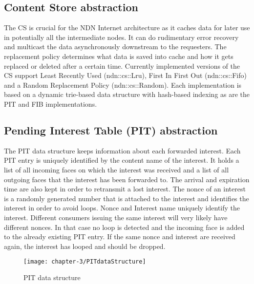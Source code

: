 \subsection{Content Store abstraction}

The CS is crucial for the NDN Internet architecture as it caches data for later use in potentially all the intermediate nodes. It can do rudimentary error recovery and multicast the data asynchronously downstream to the requesters. The replacement policy determines what data is saved into cache and how it gets replaced or deleted after a certain time. Currently implemented versions of the CS support Least Recently Used (ndn::cs::Lru), First In First Out (ndn::cs::Fifo) and a Random Replacement Policy (ndn::cs::Random). Each implementation is based on a dynamic trie-based data structure with hash-based indexing as are the PIT and FIB implementations.

\subsection{Pending Interest Table (PIT) abstraction}

The PIT data structure keeps information about each forwarded interest. Each PIT entry is uniquely identified by the content name of the interest. It holds a list of all incoming faces on which the interest was received and a list of all outgoing faces that the interest has been forwarded to. The arrival and expiration time are also kept in order to retransmit a lost interest. The nonce of an interest is a randomly generated number that is attached to the interest and identifies the interest in order to avoid loops. Nonce and Interest name uniquely identify the interest. Different consumers issuing the same interest will very likely have different nonces. In that case no loop is detected and the incoming face is added to the already existing PIT entry. If the same nonce and interest are received again, the interest has looped and should be dropped.

\begin{figure}[H]
  \centering
  \texttt{[image: chapter-3/PITdataStructure]}
  \caption{PIT data structure}
  \label{fig:PITdataStructure}
\end{figure}

